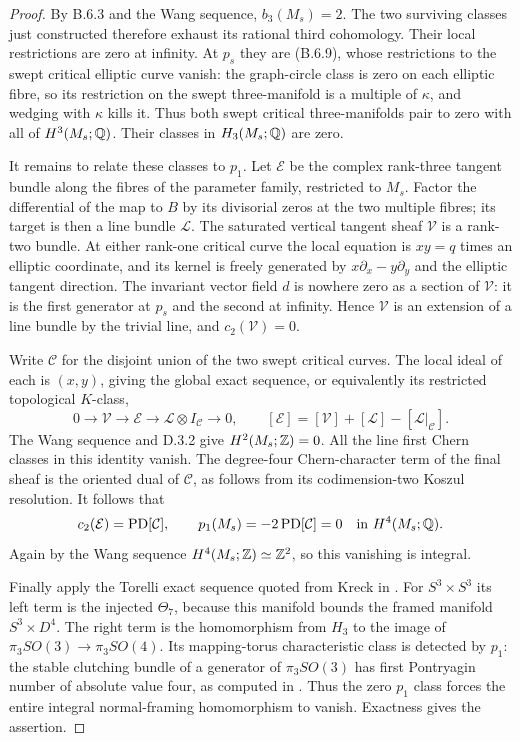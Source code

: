 \begin{proof}
By B.6.3 and the Wang sequence, $b_3(M_s)=2$. The two surviving
classes just constructed therefore exhaust its rational third
cohomology. Their local restrictions are zero at infinity. At
$p_s$ they are (B.6.9), whose restrictions to the swept critical
elliptic curve vanish: the graph-circle class is zero on each
elliptic fibre, so its restriction on the swept three-manifold is
a multiple of $\kappa$, and wedging with $\kappa$ kills it.
Thus both swept critical three-manifolds pair to zero with all of
$H^3(M_s;\mathbb Q)$. Their classes in $H_3(M_s;\mathbb Q)$ are zero.

It remains to relate these classes to $p_1$. Let $\mathcal E$ be
the complex rank-three tangent bundle along the fibres of the
parameter family, restricted to $M_s$. Factor the differential
of the map to $B$ by its divisorial zeros at the two multiple
fibres; its target is then a line bundle $\mathcal L$. The
saturated vertical tangent sheaf $\mathcal V$ is a rank-two
bundle. At either rank-one critical curve the local equation is
$xy=q$ times an elliptic coordinate, and its kernel is freely
generated by
$x\partial_x-y\partial_y$ and the elliptic tangent direction.
The invariant vector field $d$ is nowhere zero as a section of
$\mathcal V$: it is the first generator at $p_s$ and the second
at infinity. Hence $\mathcal V$ is an extension of a line bundle
by the trivial line, and $c_2(\mathcal V)=0$.

Write $\mathcal C$ for the disjoint union of the two swept critical
curves. The local ideal of each is $(x,y)$, giving the global
exact sequence, or equivalently its restricted topological $K$-class,
\[
 0\longrightarrow\mathcal V\longrightarrow\mathcal E
 \longrightarrow\mathcal L\otimes I_{\mathcal C}\longrightarrow0,
 \qquad
 [\mathcal E]=[\mathcal V]+[\mathcal L]-[\mathcal L|_{\mathcal C}].
\]
The Wang sequence and D.3.2 give $H^2(M_s;\mathbb Z)=0$. All the line
first Chern classes in this identity vanish. The degree-four
Chern-character term of the final sheaf is the oriented dual of
$\mathcal C$, as follows from its codimension-two Koszul resolution.
It follows that
\[
 c_2(\mathcal E)=\operatorname{PD}[\mathcal C],\qquad
 p_1(M_s)=-2\operatorname{PD}[\mathcal C]=0
       \quad\hbox{in }H^4(M_s;\mathbb Q).
\]
Again by the Wang sequence $H^4(M_s;\mathbb Z)\simeq\mathbb Z^2$, so this
vanishing is integral.

Finally apply the Torelli exact sequence quoted from Kreck in
\cite[Section 2.1, equation (2)]{mapsKrylov03}. For $S^3\times S^3$
its left term is the injected $\Theta_7$, because this manifold
bounds the framed manifold $S^3\times D^4$. The right term is
the homomorphism from $H_3$ to the image of
$\pi_3SO(3)\to\pi_3SO(4)$. Its mapping-torus characteristic class
is detected by $p_1$: the stable clutching bundle of a generator
of $\pi_3SO(3)$ has first Pontryagin number of absolute value four,
as computed in \cite[proof of Theorem 2]{mapsKrylov03}. Thus the
zero $p_1$ class forces the entire integral normal-framing
homomorphism to vanish. Exactness gives the assertion.
\end{proof}

